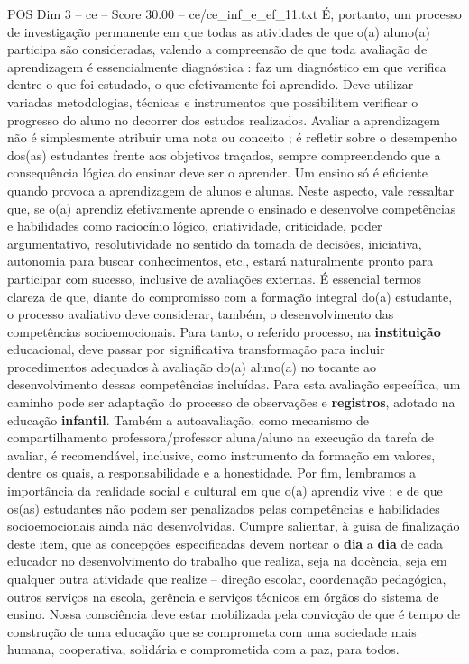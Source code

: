 \begin{textsample}{POS Dim 3 – ce – Score 30.00 – ce/ce\_inf\_e\_ef\_11.txt}
É, portanto, um processo de investigação permanente em que todas as atividades de que o(a) aluno(a) participa são consideradas, valendo a compreensão de que toda avaliação de aprendizagem é essencialmente diagnóstica : faz um diagnóstico em que verifica dentre o que foi estudado, o que efetivamente foi aprendido.
Deve utilizar variadas metodologias, técnicas e instrumentos que possibilitem verificar o progresso do aluno no decorrer dos estudos realizados.
Avaliar a aprendizagem não é simplesmente atribuir uma nota ou conceito ; é refletir sobre o desempenho dos(as) estudantes frente aos objetivos traçados, sempre compreendendo que a consequência lógica do ensinar deve ser o aprender.
Um ensino só é eficiente quando provoca a aprendizagem de alunos e alunas.
Neste aspecto, vale ressaltar que, se o(a) aprendiz efetivamente aprende o ensinado e desenvolve competências e habilidades como raciocínio lógico, criatividade, criticidade, poder argumentativo, resolutividade no sentido da tomada de decisões, iniciativa, autonomia para buscar conhecimentos, etc., estará naturalmente pronto para participar com sucesso, inclusive de avaliações externas.
É essencial termos clareza de que, diante do compromisso com a formação integral do(a) estudante, o processo avaliativo deve considerar, também, o desenvolvimento das competências socioemocionais.
Para tanto, o referido processo, na \textbf{instituição} educacional, deve passar por significativa transformação para incluir procedimentos adequados à avaliação do(a) aluno(a) no tocante ao desenvolvimento dessas competências incluídas.
Para esta avaliação específica, um caminho pode ser adaptação do processo de observações e \textbf{registros}, adotado na educação \textbf{infantil}.
Também a autoavaliação, como mecanismo de compartilhamento professora/professor aluna/aluno na execução da tarefa de avaliar, é recomendável, inclusive, como instrumento da formação em valores, dentre os quais, a responsabilidade e a honestidade.
Por fim, lembramos a importância da realidade social e cultural em que o(a) aprendiz vive ; e de que os(as) estudantes não podem ser penalizados pelas competências e habilidades socioemocionais ainda não desenvolvidas.
Cumpre salientar, à guisa de finalização deste item, que as concepções especificadas devem nortear o \textbf{dia} a \textbf{dia} de cada educador no desenvolvimento do trabalho que realiza, seja na docência, seja em qualquer outra atividade que realize – direção escolar, coordenação pedagógica, outros serviços na escola, gerência e serviços técnicos em órgãos do sistema de ensino.
Nossa consciência deve estar mobilizada pela convicção de que é tempo de construção de uma educação que se comprometa com uma sociedade mais humana, cooperativa, solidária e comprometida com a paz, para todos.

\end{textsample}
